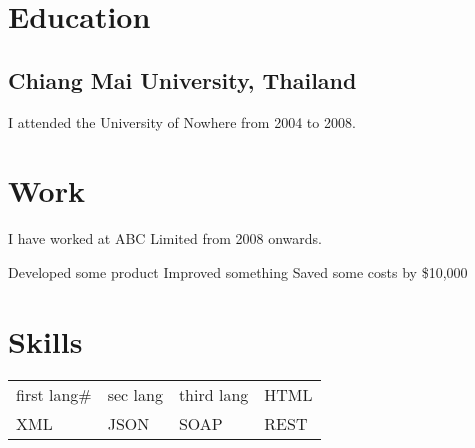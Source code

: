 \documentclass{cleanformat}
\begin{document}

\section{Education}

\subsection{Chiang Mai University, Thailand}

I attended the University of Nowhere from 2004 to 2008.

\section{Work}
I have worked at ABC Limited from 2008 onwards.

\workitems
{Developed some product}
{Improved something}
{Saved some costs by \$10,000}

\section{Skills}

\begin{tabular}{l l l l}
first lang\# & sec lang & third lang & HTML \\
XML & JSON & SOAP & REST
\end{tabular}
\end{document}
